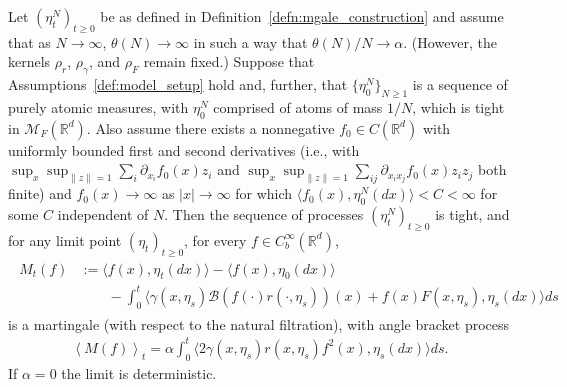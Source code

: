 \documentclass[EJP]{ejpecp} %
\newcommand{\IR}{\mathbb R}
\newcommand{\measures}{\mathcal{M}_F(\IR^d)} %
\begin{document}
\begin{theorem} \label{thm:nonlocal_convergence}
    Let $(\eta^N_t)_{t \geq 0}$
    be as defined in Definition~\ref{defn:mgale_construction}
	and assume that as $N \to \infty$, $\theta(N) \to \infty$
	in such a way that $\theta(N)/N \to \alpha$.
    (However, the kernels $\rho_r$, $\rho_\gamma$, and $\rho_F$
    remain fixed.) 
    Suppose that Assumptions~\ref{def:model_setup} hold and, 
    further, that $\{\eta_0^N\}_{N\geq 1}$ is a sequence of 
    purely atomic measures, with $\eta_0^N$ comprised of atoms of mass $1/N$,
    which is tight in $\measures$.
    Also assume there exists a nonnegative $f_0 \in C(\IR^d)$
    with uniformly bounded first and second derivatives
    (i.e., with $\sup_x \sup_{\|z\|=1} \sum_i \partial_{x_i} f_0(x) z_i$
    and $\sup_x \sup_{\|z\|=1} \sum_{ij} \partial_{x_i x_j} f_0(x) z_i z_j$ both finite)
    and $f_0(x) \to \infty$ as $|x| \to \infty$ for which
    $\langle f_0(x), \eta_0^N(dx)\rangle<C<\infty$
    for some $C$ independent of $N$.
    Then the sequence of processes
    $(\eta^N_t)_{t \geq 0}$ is tight, and for any limit point
    $(\eta_t)_{t \geq 0}$, for every $f \in C^\infty_b(\IR^d)$,
    \begin{align} \label{eqn:limiting_mgale_problem}
        \begin{split}
        M_t(f)
            &:=
            \langle f(x), \eta_t(dx) \rangle
            -
            \langle f(x), \eta_0(dx) \rangle
            \\ & \qquad
            -
            \int_0^t \big\langle
                \gamma(x, \eta_s)
                \mathcal{B}\left(
                    f(\cdot) r(\cdot, \eta_s)
                \right)(x)
                +
                f(x)
                F(x, \eta_s),
                \eta_{s}(dx)
            \big\rangle ds
        \end{split}
    \end{align}
    is a martingale (with respect to the natural filtration),
    with angle bracket process
    \begin{align} \label{eqn:limiting_mgale_variation}
        \left\langle M(f) \right\rangle_t
        =
        \alpha
        \int_0^t
        \big\langle
	    2\gamma\left( x, \eta_{s} \right)
            r\left(x, \eta_{s} \right)%
            f^2(x),
            \eta_{s} (dx)
        \big\rangle ds. 
    \end{align}
    If $\alpha = 0$ the limit is deterministic.
\end{theorem}
\end{document}
